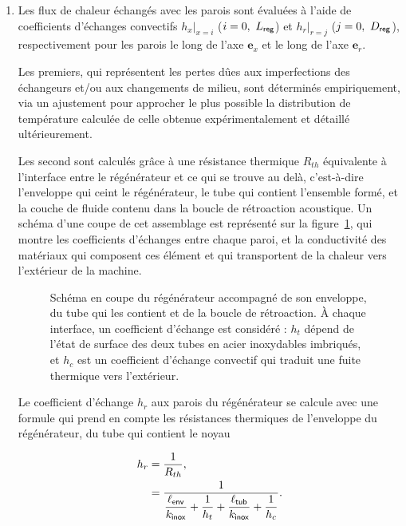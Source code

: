 \begin{enumerate}[label=\textbf{(\roman*)}]
\item Les flux de chaleur échangés avec les parois sont évaluées à l'aide de coefficients d'échanges convectifs $\left.h_x\right|_{x=i}$ ($i=0,\ L_{\sf reg}$) et $\left.h_r\right|_{r=j}$ ($j=0,\ D_{\sf reg}$), respectivement pour les parois le long de l'axe $\mathbf e_x$ et le long de l'axe $\mathbf e_r$. 

Les premiers, qui représentent les pertes dûes aux imperfections des échangeurs et/ou aux changements de milieu, sont déterminés empiriquement, via un ajustement pour approcher le plus possible la distribution de température calculée de celle obtenue expérimentalement et détaillé ultérieurement. 

Les second sont calculés grâce à une résistance thermique $R_{th}$ équivalente à l'interface entre le régénérateur et ce qui se trouve au delà, c'est-à-dire l'enveloppe qui ceint le régénérateur, le tube qui contient l'ensemble formé, et la couche de fluide contenu dans la boucle de rétroaction acoustique. Un schéma d'une coupe de cet assemblage est représenté sur la figure~\ref{fig:TemperatureCanisterConditionLimite}, qui montre les coefficients d'échanges entre chaque paroi, et la conductivité des matériaux qui composent ces élément et qui transportent de la chaleur vers l'extérieur de la machine.

\begin{figure}[!ht]
	\centering
	
	\caption{Schéma en coupe du régénérateur accompagné de son enveloppe, du tube qui les contient et de la boucle de rétroaction. À chaque interface, un coefficient d'échange est considéré : $h_t$ dépend de l'état de surface des deux tubes en acier inoxydables imbriqués, et $h_c$ est un coefficient d'échange convectif qui traduit une fuite thermique vers l'extérieur.}
	\label{fig:TemperatureCanisterConditionLimite}
\end{figure}

Le coefficient d'échange $h_r$ aux parois du régénérateur se calcule avec une formule qui prend en compte les résistances thermiques de l'enveloppe du régénérateur, du tube qui contient le noyau \cite{guedra_etudes_2012, penelet_etude_2004}

	\begin{align}
		h_r &= \frac{1}{R_{th}},\nonumber \\
			&= \dfrac{1}{\dfrac{\ell_{\sf env}}{k_{\sf inox}} + \dfrac{1}{h_t} + \dfrac{\ell_{\sf tub}}{k_{\sf inox}} + \dfrac{1}{h_c}}.\label{eq:h_r_Rth}
	\end{align}


\end{enumerate}
